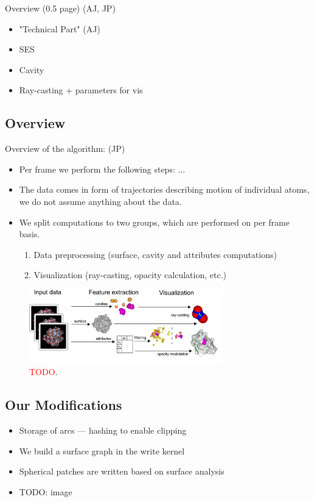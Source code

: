 Overview (0.5 page) (AJ, JP)
\begin{itemize}
  \item "Technical Part" (AJ)
  \item SES
  \item Cavity
  \item Ray-casting + parameters for vis
\end{itemize}

\subsection{Overview}
Overview of the algorithm: (JP)
\begin{itemize}
  \item Per frame we perform the following steps: ...
  \item The data comes in form of trajectories describing motion of individual atoms, we do not assume anything about the data.
  \item We split computations to two groups, which are performed on per frame basis.
	\begin{enumerate}
	  \item Data preprocessing (surface, cavity and attributes computations)
		\item Visualization  (ray-casting, opacity calculation, etc.)
	\end{enumerate}
\end{itemize}

\begin{figure}[htb]
  \centering
  \includegraphics[width=3.3in]{image/overview.png}
  \caption{\textcolor{red}{TODO}.}
	\label{fig:overview}
\end{figure}

\subsection{Our Modifications}
\begin{itemize}
  \item Storage of arcs --- hashing to enable clipping
	\item We build a surface graph in the write kernel
	\item Spherical patches are written based on surface analysis
	\item TODO: image
\end{itemize}

